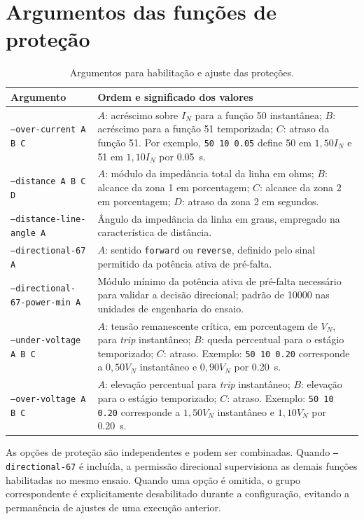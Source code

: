 \section{Argumentos das funções de proteção}

\begin{table}[H]
  \centering
  \small
  \caption{Argumentos para habilitação e ajuste das proteções.}
  \begin{tabular}{p{5.5cm}p{7.7cm}}
    \toprule
    Argumento & Ordem e significado dos valores \\
    \midrule
    \texttt{--over-current A B C} & $A$: acréscimo sobre $I_N$ para a função 50 instantânea; $B$: acréscimo para a função 51 temporizada; $C$: atraso da função 51. Por exemplo, \texttt{50 10 0.05} define 50 em $1{,}50I_N$ e 51 em $1{,}10I_N$ por \SI{0,05}{\second}. \\
    \texttt{--distance A B C D} & $A$: módulo da impedância total da linha em ohms; $B$: alcance da zona 1 em porcentagem; $C$: alcance da zona 2 em porcentagem; $D$: atraso da zona 2 em segundos. \\
    \texttt{--distance-line-angle A} & Ângulo da impedância da linha em graus, empregado na característica de distância. \\
    \texttt{--directional-67 A} & $A$: sentido \texttt{forward} ou \texttt{reverse}, definido pelo sinal permitido da potência ativa de pré-falta. \\
    \texttt{--directional-67-power-min A} & Módulo mínimo da potência ativa de pré-falta necessário para validar a decisão direcional; padrão de 10000 nas unidades de engenharia do ensaio. \\
    \texttt{--under-voltage A B C} & $A$: tensão remanescente crítica, em porcentagem de $V_N$, para \textit{trip} instantâneo; $B$: queda percentual para o estágio temporizado; $C$: atraso. Exemplo: \texttt{50 10 0.20} corresponde a $0{,}50V_N$ instantâneo e $0{,}90V_N$ por \SI{0,20}{\second}. \\
    \texttt{--over-voltage A B C} & $A$: elevação percentual para \textit{trip} instantâneo; $B$: elevação para o estágio temporizado; $C$: atraso. Exemplo: \texttt{50 10 0.20} corresponde a $1{,}50V_N$ instantâneo e $1{,}10V_N$ por \SI{0,20}{\second}. \\
    \bottomrule
  \end{tabular}
\end{table}

As opções de proteção são independentes e podem ser combinadas. Quando \texttt{--directional-67} é incluída, a permissão direcional supervisiona as demais funções habilitadas no mesmo ensaio. Quando uma opção é omitida, o grupo correspondente é explicitamente desabilitado durante a configuração, evitando a permanência de ajustes de uma execução anterior.

